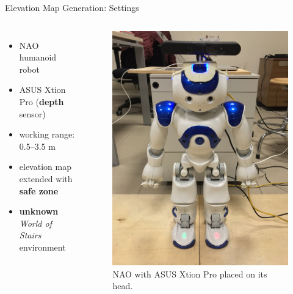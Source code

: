 \documentclass[10pt]{beamer}
\begin{document}
\begin{frame}{Elevation Map Generation: Settings}
	\begin{columns}[c,onlytextwidth]
			\begin{itemize}
				\item NAO humanoid robot
				\item ASUS Xtion Pro (\textbf{depth} sensor)
				\item working range: 0.5--3.5 m
				\item elevation map extended with \textbf{safe zone}
				\item \textbf{unknown} \textit{World of Stairs} environment
			\end{itemize}	
		  \begin{figure}
        \centering
        \includegraphics[width=\textwidth]{figures/NAO-with-xtion.JPEG}
        \caption{NAO with ASUS Xtion Pro placed on its head.}
    	\end{figure}		
	\end{columns}
\end{frame}
\end{document}
